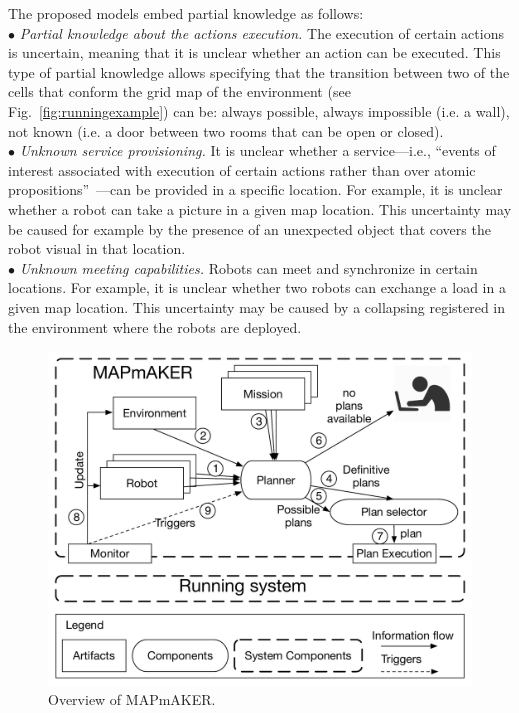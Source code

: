 The proposed models embed partial knowledge as follows:\\
$\bullet$  \emph{Partial knowledge about the actions execution.} 
The execution of certain actions is uncertain, meaning that it is unclear whether an action can be executed.
This type of partial knowledge allows specifying that the transition between two of the cells that conform the grid map of the environment (see Fig.~\ref{fig:runningexample}) can be:
always possible, always impossible (i.e. a wall), not known (i.e. a door between two rooms that can be open or closed).\\
$\bullet$ \emph{Unknown service provisioning.} 
It is unclear  whether a service---i.e.,  ``events of interest associated with execution of certain actions rather than over atomic propositions''~\cite{guo2015multi}---can be provided in a specific location. 
For example, it is unclear whether a robot can take a picture in a given map location.
This  uncertainty may be caused for example by the presence of an unexpected object that covers the robot visual in that location.\\
$\bullet$ \emph{Unknown meeting capabilities.} Robots can meet and synchronize in certain locations.
For example, it is unclear whether two robots can exchange a load in a given map location.
This uncertainty may be caused by a collapsing registered in the environment where the robots are deployed.


\begin{figure}[t]
\begin{center}
\includegraphics[width=1\linewidth]{Figures/MAPmAKER.pdf}
\caption{Overview of  MAPmAKER.}
\label{fig:overview}
\end{center}
\end{figure}




